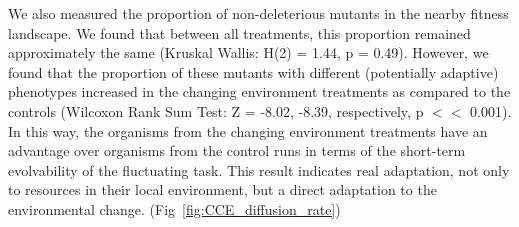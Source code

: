 \documentclass[PhD]{msu-thesis}
\begin{document}
We also measured the proportion of non-deleterious mutants in the nearby fitness landscape. We found that between all treatments, this proportion
remained approximately the same (Kruskal Wallis: H(2) = 1.44, p = 0.49). However, we found that the proportion of these mutants with different (potentially adaptive) phenotypes increased in the changing environment treatments as compared to the controls (Wilcoxon Rank Sum Test: Z = -8.02, -8.39, respectively, p $<<$ 0.001). In this way, the organisms from the changing environment treatments have an advantage over organisms from the control runs in terms of the short-term evolvability of the fluctuating task. This result indicates real adaptation, not only to resources in their local environment, but a direct adaptation to the environmental change. (Fig~\ref{fig:CCE_diffusion_rate})
\end{document}
